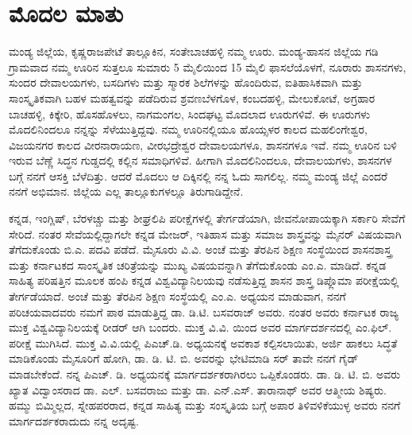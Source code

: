 \makeatletter
\renewcommand{\@makeschapterhead}[1]{%
  \vspace*{20\p@}%
  {\parindent \z@ \raggedright
    \normalfont
    \interlinepenalty\@M
    \Huge \bfseries  #1\par\nobreak
    \vskip 20\p@
  }}
\makeatother
\chapter*{ಮೊದಲ ಮಾತು}

ಮಂಡ್ಯ ಜಿಲ್ಲೆಯ, ಕೃಷ್ಣರಾಜಪೇಟೆ ತಾಲ್ಲೂಕಿನ, ಸಂತೇಬಾಚಹಳ್ಳಿ ನಮ್ಮ ಊರು.  ಮಂಡ್ಯ{\rm -}ಹಾಸನ ಜಿಲ್ಲೆಯ  ಗಡಿ ಗ್ರಾಮವಾದ ನಮ್ಮ ಊರಿನ ಸುತ್ತಲೂ ಸುಮಾರು 5 ಮೈಲಿಯಿಂದ 15 ಮೈಲಿ ಫಾಸಲೆಯೊಳಗೆ,  ನೂರಾರು ಶಾಸನಗಳು, ಸುಂದರ ದೇವಾಲಯಗಳು, ಬಸದಿಗಳು ಮತ್ತು ಸ್ಮಾರಕ ಶಿಲೆಗಳನ್ನು ಹೊಂದಿರುವ, ಐತಿಹಾಸಿಕವಾಗಿ ಮತ್ತು ಸಾಂಸ್ಕೃತಿಕವಾಗಿ ಬಹಳ ಮಹತ್ವವನ್ನು ಪಡೆದಿರುವ ಶ್ರವಣಬೆಳಗೊಳ, ಕಂಬದಹಳ್ಳಿ, ಮೇಲುಕೋಟೆ, ಅಗ್ರಹಾರ ಬಾಚಹಳ್ಳಿ, ಕಿಕ್ಕೇರಿ, ಹೊಸಹೊಳಲು, ನಾಗಮಂಗಲ, ಸಿಂದಘಟ್ಟ ಮೊದಲಾದ ಊರುಗಳಿವೆ.  ಈ ಊರುಗಳು ಮೊದಲಿನಿಂದಲೂ ನನ್ನನ್ನು ಸೆಳೆಯುತ್ತಿದ್ದವು. ನಮ್ಮ ಊರಿನಲ್ಲಿಯೂ ಹೊಯ್ಸಳರ ಕಾಲದ ಮಹಲಿಂಗೇಶ್ವರ, ವಿಜಯನಗರ ಕಾಲದ ವೀರನಾರಾಯಣ, ವೀರಭದ್ರೇಶ್ವರ ದೇವಾಲಯಗಳೂ, ಶಾಸನಗಳೂ ಇವೆ.  ನಮ್ಮ ಊರಿನ ಬಳಿ ಇರುವ ಬೆಣ್ಣೆ ಸಿದ್ಧನ ಗುಡ್ಡದಲ್ಲಿ ಕಲ್ಲಿನ ಸಮಾಧಿಗಳಿವೆ.  ಹೀಗಾಗಿ ಮೊದಲಿನಿಂದಲೂ, ದೇವಾಲಯಗಳು, ಶಾಸನಗಳ ಬಗ್ಗೆ ನನಗೆ ಆಸಕ್ತಿ ಬೆಳೆದಿತ್ತು. ಆದರೆ ಮೊದಲು ಆ ದಿಕ್ಕಿನಲ್ಲಿ ನನ್ನ ಓದು ಸಾಗಲಿಲ್ಲ. ನಮ್ಮ ಮಂಡ್ಯ ಜಿಲ್ಲೆ ಎಂದರೆ ನನಗೆ ಅಭಿಮಾನ. ಜಿಲ್ಲೆಯ ಎಲ್ಲ ತಾಲ್ಲೂಕುಗಳಲ್ಲೂ ತಿರುಗಾಡಿದ್ದೇನೆ.

ಕನ್ನಡ, ಇಂಗ್ಲಿಷ್​, ಬೆರಳಚ್ಚು ಮತ್ತು ಶೀಘ್ರಲಿಪಿ ಪರೀಕ್ಷೆಗಳಲ್ಲಿ ತೇರ್ಗಡೆಯಾಗಿ, ಜೀವನೋಪಾಯಕ್ಕಾಗಿ ಸರ್ಕಾರಿ ಸೇವೆಗೆ ಸೇರಿದೆ. ನಂತರ ಸೇವೆಯಲ್ಲಿದ್ದಾಗಲೇ ಕನ್ನಡ ಮೇಜರ್​, ಇತಿಹಾಸ ಮತ್ತು  ಸಮಾಜ ಶಾಸ್ತ್ರವನ್ನು ಮೈನರ್​ ವಿಷಯವಾಗಿ ತೆಗೆದುಕೊಂಡು ಬಿ.ಎ. ಪದವಿ ಪಡೆದೆ. ಮೈಸೂರು ವಿ.ವಿ. ಅಂಚೆ ಮತ್ತು ತೆರಪಿನ ಶಿಕ್ಷಣ ಸಂಸ್ಥೆಯಿಂದ ಶಾಸನಶಾಸ್ತ್ರ ಮತ್ತು ಕರ್ನಾಟಕದ ಸಾಂಸ್ಕೃತಿಕ ಚರಿತ್ರೆಯನ್ನು ಮುಖ್ಯ ವಿಷಯವನ್ನಾಗಿ ತೆಗೆದುಕೊಂಡು ಎಂ.ಎ. ಮಾಡಿದೆ. ಕನ್ನಡ ಸಾಹಿತ್ಯ ಪರಿಷತ್ತಿನ ಮೂಲಕ ಹಂಪಿ ಕನ್ನಡ ವಿಶ್ವವಿದ್ಯಾನಿಲಯವು ನಡೆಸುತ್ತಿದ್ದ ಶಾಸನ ಶಾಸ್ತ್ರ ಡಿಪ್ಲೊಮಾ ಪರೀಕ್ಷೆಯಲ್ಲಿ ತೇರ್ಗಡೆಯಾದೆ. ಅಂಚೆ ಮತ್ತು ತೆರಪಿನ ಶಿಕ್ಷಣ ಸಂಸ್ಥೆಯಲ್ಲಿ ಎಂ.ಎ. ಅಧ್ಯಯನ ಮಾಡುವಾಗ,  ನನಗೆ ಪರಿಚಯವಾದವರು ನಮಗೆ ಪಾಠ ಮಾಡುತ್ತಿದ್ದ ಡಾ. ಡಿ.ಟಿ. ಬಸವರಾಜ್​ ಅವರು.   ನಂತರ ಅವರು ಕರ್ನಾಟಕ ರಾಜ್ಯ ಮುಕ್ತ ವಿಶ್ವವಿದ್ಯಾನಿಲಯಕ್ಕೆ ರೀಡರ್​ ಆಗಿ ಬಂದರು. ಮುಕ್ತ ವಿ.ವಿ. ಯಿಂದ ಅವರ ಮಾರ್ಗದರ್ಶನದಲ್ಲಿ ಎಂ.ಫಿಲ್​. ಪರೀಕ್ಷೆ ಮುಗಿಸಿದೆ. ಮುಕ್ತ ವಿ.ವಿ.ಯಲ್ಲಿ ಪಿಎಚ್​.ಡಿ. ಅಧ್ಯಯನಕ್ಕೆ ಅವಕಾಶ ಕಲ್ಪಿಸಲಾಯಿತು, ಅರ್ಜಿ ಹಾಕಲು ಸಿದ್ಧತೆ ಮಾಡಿಕೊಂಡು ಮೈಸೂರಿಗೆ ಹೋಗಿ, ಡಾ. ಡಿ. ಟಿ. ಬಿ. ಅವರನ್ನು ಭೇಟಿಮಾಡಿ ಸರ್​ ತಾವೇ ನನಗೆ ಗೈಡ್​ ಮಾಡಬೇಕೆಂದೆ. ನನ್ನ ಪಿಎಚ್. ಡಿ. ಅಧ್ಯಯನಕ್ಕೆ  ಮಾರ್ಗದರ್ಶಕರಾಗಿರಲು ಒಪ್ಪಿಕೊಂಡರು. ಡಾ. ಡಿ. ಟಿ. ಬಿ. ಅವರು ಖ್ಯಾತ ವಿದ್ವಾಂಸರಾದ ಡಾ. ಎಲ್​. ಬಸವರಾಜು ಮತ್ತು ಡಾ. ಎನ್​.ಎಸ್​. ತಾರಾನಾಥ್​ ಅವರ ಆತ್ಮೀಯ ಶಿಷ್ಯರು. ಹಮ್ಮು ಬಿಮ್ಮಿಲ್ಲದ, ಸ್ನೇಹಪರರಾದ, ಕನ್ನಡ ಸಾಹಿತ್ಯ ಮತ್ತು ಸಂಸ್ಕೃತಿಯ ಬಗ್ಗೆ ಅಪಾರ ತಿಳಿವಳಿಕೆಯುಳ್ಳ ಅವರು ನನಗೆ ಮಾರ್ಗದರ್ಶಕರಾದುದು ನನ್ನ ಅದೃಷ್ಟ.

